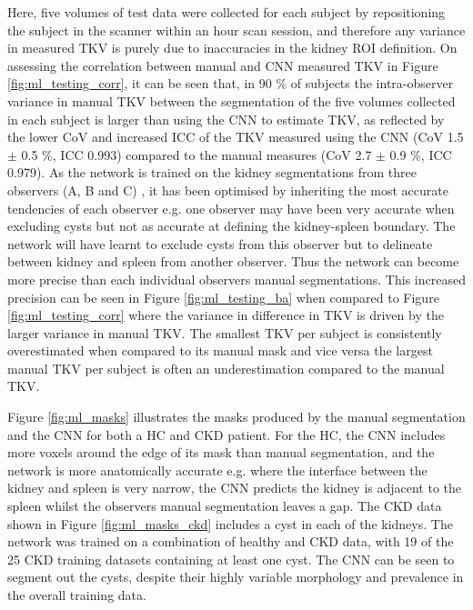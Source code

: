 Here, five volumes of test data were collected for each subject by repositioning the subject in the scanner within an hour scan session, and therefore any variance in measured \ac{TKV} is purely due to inaccuracies in the kidney \ac{ROI} definition. On assessing the correlation between manual and \ac{CNN} measured \ac{TKV} in Figure \ref{fig:ml_testing_corr}, it can be seen that, in 90 \% of subjects the intra-observer variance in manual \ac{TKV} between the segmentation of the five volumes collected in each subject is larger than using the \ac{CNN} to estimate \ac{TKV}, as reflected by the lower \ac{CoV} and increased \ac{ICC} of the \ac{TKV} measured using the \ac{CNN} (\ac{CoV} 1.5 $\pm$ 0.5 \%, \ac{ICC} 0.993) compared to the manual measures (\ac{CoV} 2.7 $\pm$ 0.9 \%, ICC 0.979). As the network is trained on the kidney segmentations from three observers (A, B and C) , it has been optimised by inheriting the most accurate tendencies of each observer e.g. one observer may have been very accurate when excluding cysts but not as accurate at defining the kidney-spleen boundary. The network will have learnt to exclude cysts from this observer but to delineate between kidney and spleen from another observer. Thus the network can become more precise than each individual observers manual segmentations. This increased precision can be seen in Figure \ref{fig:ml_testing_ba} when compared to Figure \ref{fig:ml_testing_corr} where the variance in difference in \ac{TKV} is driven by the larger variance in manual \ac{TKV}. The smallest \ac{TKV} per subject is consistently overestimated when compared to its manual mask and vice versa the largest manual \ac{TKV} per subject is often an underestimation compared to the manual \ac{TKV}. 

Figure \ref{fig:ml_masks} illustrates the masks produced by the manual segmentation and the \ac{CNN} for both a \ac{HC} and \ac{CKD} patient. For the \ac{HC}, the \ac{CNN} includes more voxels around the edge of its mask than manual segmentation, and the network is more anatomically accurate e.g. where the interface between the kidney and spleen is very narrow, the \ac{CNN} predicts the kidney is adjacent to the spleen whilst the observers manual segmentation leaves a gap. The \ac{CKD} data shown in Figure \ref{fig:ml_masks_ckd} includes a cyst in each of the kidneys. The network was trained on a combination of healthy and \ac{CKD} data, with 19 of the 25 \ac{CKD} training datasets containing at least one cyst. The \ac{CNN} can be seen to segment out the cysts, despite their highly variable morphology and prevalence in the overall training data.
 
